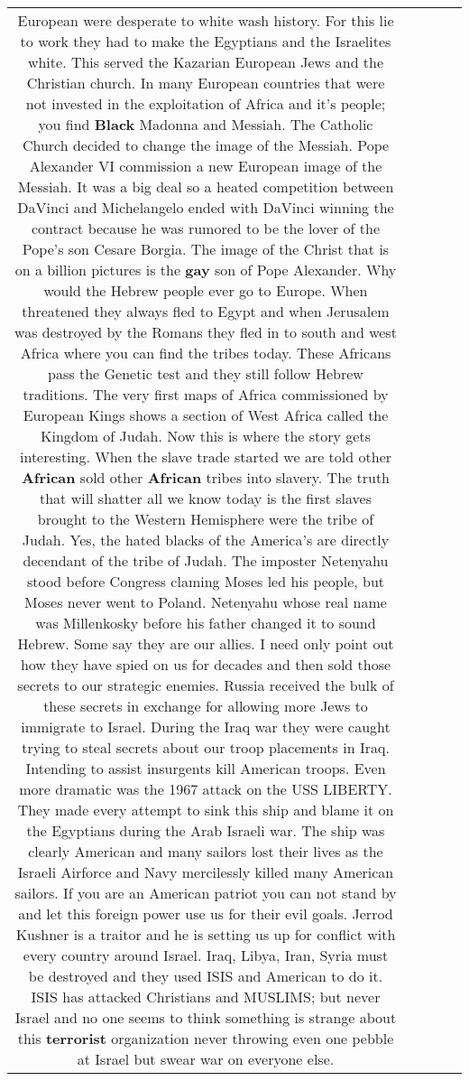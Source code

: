 \documentclass[11pt]{article}
\newlength\mylength
\begin{document}
\begin{center}
\begin{longtable}{|C{.65\mylength}|C{.30\mylength}|C{.12\mylength}|C{.12\mylength}|C{.12\mylength}|}
European were desperate to white wash history. For this lie to work they had to make the Egyptians and the Israelites white. This served the Kazarian European Jews and the Christian church. In many European countries that were not invested in the exploitation of Africa and it's people; you find \textbf{Black} Madonna and Messiah.
The Catholic Church decided to change the image of the Messiah. Pope Alexander VI commission a new European image of the Messiah. It was a big deal so a heated competition between DaVinci and Michelangelo ended with DaVinci winning the contract because he was rumored to be the lover of the Pope's son Cesare Borgia. The image of the Christ that is on a billion pictures is the \textbf{g\textbf{ay}} son of Pope Alexander. 
Why would the Hebrew people ever go to Europe. When threatened they always fled to Egypt and when Jerusalem was destroyed by the Romans they fled in to south and west Africa where you can find the tribes today. These Africans pass the Genetic test and they still follow Hebrew traditions. 
The very first maps of Africa commissioned by European Kings shows a section of West Africa called the Kingdom of Judah. Now this is where the story gets interesting. When the slave trade started we are told other \textbf{African} sold other \textbf{African} tribes into slavery. The truth that will shatter all we know today is the first slaves brought to the Western Hemisphere were the tribe of Judah. Yes, the hated blacks of the America's are directly decendant of the tribe of Judah.
The imposter Netenyahu stood before Congress claming Moses led his people, but Moses never went to Poland. Netenyahu whose real name was Millenkosky before his father changed it to sound Hebrew.
Some say they are our allies. I need only point out how they have spied on us for decades and then sold those secrets to our strategic enemies. Russia received the bulk of these secrets in exchange for allowing more Jews to immigrate to Israel.
During the Iraq war they were caught trying to steal secrets about our troop placements in Iraq. Intending to assist insurgents kill American troops. Even more dramatic was the 1967 attack on the USS LIBERTY. They made every attempt to sink this ship and blame it on the Egyptians during the Arab Israeli war. The ship was clearly American and many sailors lost their lives as the Israeli Airforce and Navy mercilessly killed many American sailors.
If you are an American patriot you can not stand by and let this foreign power use us for their evil goals.
Jerrod Kushner is a traitor and he is setting us up for conflict with every country around Israel. Iraq, Libya, Iran, Syria must be destroyed and they used ISIS and American to do it. ISIS has attacked Christians and MUSLIMS; but never Israel and no one seems to think something is strange about this \textbf{terrorist} organization never throwing even one pebble at Israel but swear war on everyone else.

\end{longtable}
\end{center}
\end{document}
